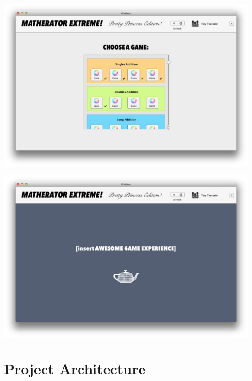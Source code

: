 \documentclass[11pt,a4paper,twoside]{report}
\begin{document}
\begin{center}
    \includegraphics[width=13.59cm]{ChooseGame}
\end{center}

\begin{center}
    \includegraphics[width=13.59cm]{GameExperience}
\end{center}








\chapter{Project Architecture}
\end{document}
